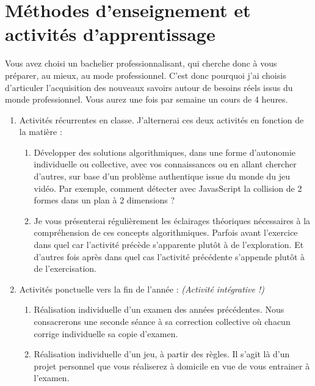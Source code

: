 \section{Méthodes d’enseignement et activités d’apprentissage}
Vous avez choisi un bachelier professionnalisant, qui cherche donc à vous préparer, au mieux, au mode professionnel. C’est donc pourquoi j’ai choisis d’articuler l’acquisition des nouveaux savoirs autour de besoins réels issus du monde professionnel. Vous aurez une fois par semaine un cours de 4 heures.
\begin{enumerate}
    \item Activités récurrentes en classe. J’alternerai ces deux activités en fonction de  la matière :
          \begin{enumerate}
              \item Développer des solutions algorithmiques, dans une forme d’autonomie individuelle ou collective, avec vos connaissances ou en allant chercher d’autres, sur base d’un problème authentique issue du monde du jeu vidéo. Par exemple, comment détecter avec JavasScript la collision de 2 formes dans un plan à 2 dimensions ?
              \item Je vous présenterai régulièrement les éclairages théoriques nécessaires à la compréhension de ces concepts algorithmiques. Parfois avant l’exercice dans quel car l’activité précède s’apparente plutôt à de l’exploration. Et d’autres fois après dans quel cas l’activité précédente s’appende plutôt à de l’exercisation.
          \end{enumerate}
    \item Activités ponctuelle vers la fin de l'année : \textit{(Activité intégrative !)}
          \begin{enumerate}
              \item Réalisation individuelle d'un examen des années précédentes. Nous consacrerons une seconde séance à sa correction collective où chacun corrige individuelle sa copie d'examen.
              \item Réalisation individuelle d'un jeu, à partir des règles. Il s’agit là d’un projet personnel que vous réaliserez à domicile en vue de vous entrainer à l’examen.
          \end{enumerate}
\end{enumerate}

\clearpage
